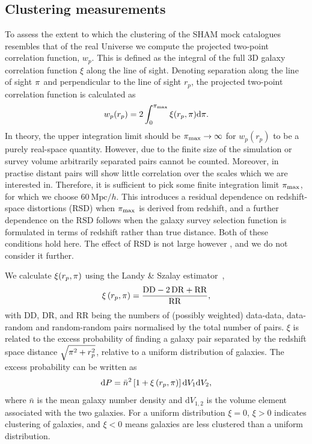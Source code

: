 \documentclass[usenatbib,useAMS]{mnras}
\begin{document}
\subsection{Clustering measurements}\label{sec:CF}

To assess the extent to which the clustering of the \ac{SHAM} mock catalogues resembles that of the real Universe we compute the projected two-point correlation function, $w_p$. This is defined as the integral of the full 3D galaxy correlation function $\xi$ along the line of sight. Denoting separation along the line of sight $\pi$ and perpendicular to the line of sight $r_p$, the projected two-point correlation function is calculated as
%
\begin{equation}
    w_p (r_p)
    =
    2 \int_{0}^{\pi_{\max}} \xi (r_p, \pi ) \mathrm{d} \pi.
\end{equation}
%
In theory, the upper integration limit should be $\pi_{\max} \to \infty$ for $w_p(r_p)$ to be a purely real-space quantity. However, due to the finite size of the simulation or survey volume arbitrarily separated pairs cannot be counted. Moreover, in practise distant pairs will show little correlation over the scales which we are interested in. Therefore, it is sufficient to pick some finite integration limit $\pi_{\max}$, for which we choose $60~\mathrm{Mpc}/h$. This introduces a residual dependence on redshift-space distortions (RSD) when $\pi_{\max}$ is derived from redshift, and a further dependence on the RSD follows when the galaxy survey selection function is formulated in terms of redshift rather than true distance. Both of these conditions hold here. The effect of RSD is not large however \citet{Norberg_et_al}, and we do not consider it further.

We calculate $\xi (r_p, \pi )$ using the Landy \& Szalay estimator~\citep{Landy_Szalay},
%
\begin{equation}\label{eq:landy_szalay}
    \xi\left(r_{p}, \pi\right)
    =
    \frac{\mathrm{DD} - 2\, \mathrm{DR} + \mathrm{RR}}{\mathrm{RR}},
\end{equation}
%
with $\mathrm{DD}$, $\mathrm{DR}$, and $\mathrm{RR}$ being the numbers of (possibly weighted) data-data, data-random and random-random pairs normalised by the total number of pairs. $\xi$ is related to the excess probability of finding a galaxy pair separated by the redshift space distance $\sqrt{\pi^2 + r_p^2}$, relative to a uniform distribution of galaxies. The excess probability can be written as 
%
\begin{equation}\label{eq:excess_probability}
    \mathrm{d}P
    =
    \bar{n}^2
    \left[ 1 + \xi\left(r_p, \pi\right) \right]\mathrm{d}V_1 \mathrm{d}V_2,
\end{equation}
%
where $\bar{n}$ is the mean galaxy number density and $\mathrm{d}V_{1, 2}$ is the volume element associated with the two galaxies. For a uniform distribution $\xi = 0$, $\xi > 0$ indicates clustering of galaxies, and $\xi < 0$ means galaxies are less clustered than a uniform distribution.
\end{document}
